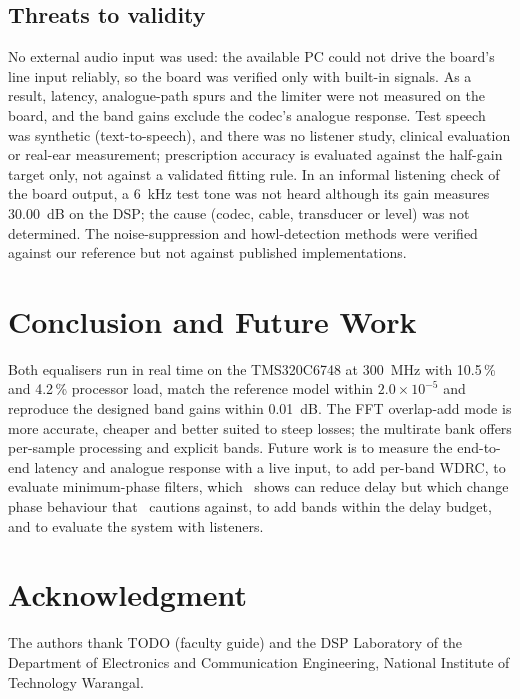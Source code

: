 \documentclass[conference]{IEEEtran}
\begin{document}
\subsection{Threats to validity}\label{sec:threats}
No external audio input was used: the available PC could not drive the board's line input reliably, so the board was verified only with built-in signals. As a result, latency, analogue-path spurs and the limiter were not measured on the board, and the band gains exclude the codec's analogue response. Test speech was synthetic (text-to-speech), and there was no listener study, clinical evaluation or real-ear measurement; prescription accuracy is evaluated against the half-gain target only, not against a validated fitting rule. In an informal listening check of the board output, a 6~kHz test tone was not heard although its gain measures 30.00~dB on the DSP; the cause (codec, cable, transducer or level) was not determined. The noise-suppression and howl-detection methods were verified against our reference but not against published implementations.

\section{Conclusion and Future Work}
Both equalisers run in real time on the TMS320C6748 at 300~MHz with 10.5\,\% and 4.2\,\% processor load, match the reference model within $2.0\times10^{-5}$ and reproduce the designed band gains within 0.01~dB. The FFT overlap-add mode is more accurate, cheaper and better suited to steep losses; the multirate bank offers per-sample processing and explicit bands. Future work is to measure the end-to-end latency and analogue response with a live input, to add per-band WDRC, to evaluate minimum-phase filters, which~\cite{sokolova2022} shows can reduce delay but which change phase behaviour that~\cite{yang2016} cautions against, to add bands within the delay budget, and to evaluate the system with listeners.

\section*{Acknowledgment}
The authors thank TODO (faculty guide) and the DSP Laboratory of the Department of Electronics and Communication Engineering, National Institute of Technology Warangal.



\end{document}
